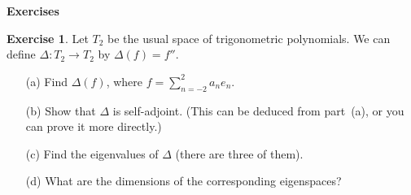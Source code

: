 \documentclass{amsart}
\newcommand{\Dl}        {\Delta}
\renewcommand{\:}       {\colon}
\theoremstyle{definition}
\newtheorem{exercise}{Exercise}[section]
\begin{document}

\begin{center}
 \Large \textbf{Exercises}
\end{center}

\begin{exercise}
 Let $T_2$ be the usual space of trigonometric polynomials.  We can
 define $\Dl\:T_2\to T_2$ by $\Dl(f)=f''$.
 \begin{itemize}
  \item[(a)] Find $\Dl(f)$, where $f=\sum_{n=-2}^2 a_ne_n$.
  \item[(b)] Show that $\Dl$ is self-adjoint. (This can be deduced
   from part~(a), or you can prove it more directly.)
  \item[(c)] Find the eigenvalues of $\Dl$ (there are three of them).
  \item[(d)] What are the dimensions of the corresponding eigenspaces? 
 \end{itemize}
\end{exercise}
\end{document}
